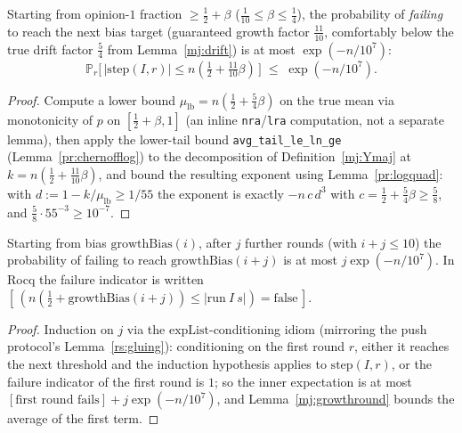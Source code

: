 \begin{lemma}\label{mj:growthround}
  \rocqok
  Starting from opinion-$1$ fraction $\ge\tfrac12+\beta$
  ($\tfrac1{10}\le\beta\le\tfrac14$), the probability of \emph{failing} to
  reach the next bias target (guaranteed growth factor $\tfrac{11}{10}$,
  comfortably below the true drift factor $\tfrac54$ from
  Lemma~\ref{mj:drift}) is at most $\exp(-n/10^7)$:
  \[
    \mathbb{P}_r\bigl[\, |\mathrm{step}(I,r)| \le n(\tfrac12 + \tfrac{11}{10}\beta) \,\bigr]
    \;\le\; \exp(-n/10^7).
  \]
\end{lemma}
\begin{proof}
  \rocqok
  Compute a lower bound $\mu_{\mathrm{lb}} = n(\tfrac12+\tfrac54\beta)$ on
  the true mean via monotonicity of $p$ on $[\tfrac12+\beta,1]$ (an inline
  \texttt{nra}/\texttt{lra} computation, not a separate lemma), then apply
  the lower-tail bound \texttt{avg\_tail\_le\_ln\_ge}
  (Lemma~\ref{pr:chernofflog}) to the decomposition of
  Definition~\ref{mj:Ymaj} at $k=n(\tfrac12+\tfrac{11}{10}\beta)$, and bound
  the resulting exponent using Lemma~\ref{pr:logquad}: with
  $d := 1 - k/\mu_{\mathrm{lb}} \ge 1/55$ the exponent is exactly
  $-n\,c\,d^3$ with $c = \tfrac12 + \tfrac54\beta \ge \tfrac58$, and
  $\tfrac58 \cdot 55^{-3} \ge 10^{-7}$.
\end{proof}

\begin{lemma}\label{mj:growthfail}
  \rocqok
  Starting from bias $\mathrm{growthBias}(i)$, after $j$ further rounds
  (with $i+j\le10$) the probability of failing to reach
  $\mathrm{growthBias}(i+j)$ is at most $j\exp(-n/10^7)$. In Rocq the
  failure indicator is written
  $[\,(n(\tfrac12 + \mathrm{growthBias}(i+j)) \le |\mathrm{run}\ I\ s|) = \mathrm{false}\,]$.
\end{lemma}
\begin{proof}
  \rocqok
  Induction on $j$ via the $\mathrm{expList}$-conditioning idiom (mirroring
  the push protocol's Lemma~\ref{rs:gluing}): conditioning on the first
  round $r$, either it reaches the next threshold and the induction
  hypothesis applies to $\mathrm{step}(I,r)$, or the failure indicator of
  the first round is $1$; so the inner expectation is at most
  $[\text{first round fails}] + j\exp(-n/10^7)$, and Lemma~\ref{mj:growthround}
  bounds the average of the first term.
\end{proof}

